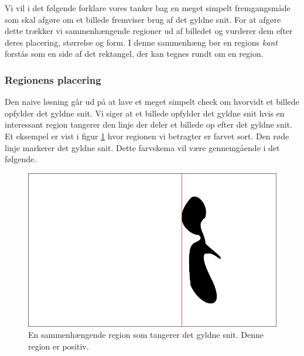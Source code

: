 {
\def\imgscale{0.34}

\textsf{Vi vil i det følgende forklare vores tanker bag en meget simpelt
fremgangsmåde som skal afgøre om et billede fremviser brug af det gyldne
snit. For at afgøre dette trækker vi sammenhængende regioner ud af
billedet og vurderer dem efter deres placering, størrelse og form. I
denne sammenhæng bør en regions \emph{kant} forstås som en side af det
rektangel, der kan tegnes rundt om en region.}

\subsubsection{Regionens placering}
Den naive løsning går ud på at lave et meget simpelt check om hvorvidt
et billede opfylder det gyldne snit. Vi siger at et billede
opfylder det gyldne snit hvis en interessant region tangerer den linje
der deler et billede op efter det gyldne snit. Et eksempel er vist i figur
\ref{pos_naiv_1} hvor regionen vi betragter er farvet sort. Den røde
linje markerer det gyldne snit. Dette farvskema vil være gennemgående i
det følgende.
\begin{figure}[h]
	\begin{center}
		\includegraphics[scale=\imgscale,angle=0]{afsnit/vores_implementation/billeder/naiv_algoritme/naiv_positiv_blob_1}
	\end{center}
	\caption[En positiv region]{En sammenhængende region som tangerer det gyldne snit.
	Denne region er positiv.}
	\label{pos_naiv_1}
\end{figure}

}
